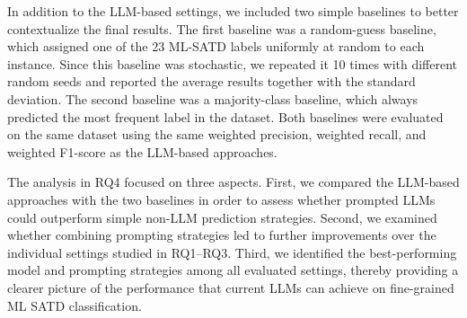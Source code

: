 \documentclass[acmsmall,screen,review,anonymous]{acmart}
\begin{document}
In addition to the LLM-based settings, we included two simple baselines to better contextualize the final results. The first baseline was a random-guess baseline, which assigned one of the 23 ML-SATD labels uniformly at random to each instance. Since this baseline was stochastic, we repeated it 10 times with different random seeds and reported the average results together with the standard deviation. The second baseline was a majority-class baseline, which always predicted the most frequent label in the dataset. Both baselines were evaluated on the same dataset using the same weighted precision, weighted recall, and weighted F1-score as the LLM-based approaches.

The analysis in RQ4 focused on three aspects. First, we compared the LLM-based approaches with the two baselines in order to assess whether prompted LLMs could outperform simple non-LLM prediction strategies. Second, we examined whether combining prompting strategies led to further improvements over the individual settings studied in RQ1--RQ3. Third, we identified the best-performing model and prompting strategies among all evaluated settings, thereby providing a clearer picture of the performance that current LLMs can achieve on fine-grained ML SATD classification.










\end{document}

